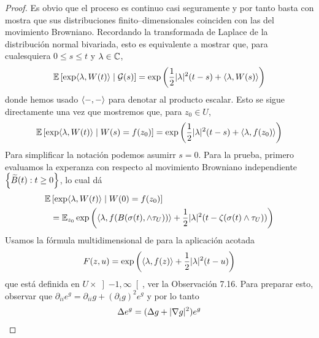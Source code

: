 \begin{proof}
  Es obvio que el proceso es continuo casi seguramente y por tanto basta con mostra que sus distribuciones finito--dimensionales coinciden con las del movimiento Browniano.
  Recordando la transformada de Laplace de la distribución normal bivariada, esto es equivalente a mostrar que, para cualesquiera \(0 \leq s \leq t\) y \(\lambda \in \mathbb{C}\),
  \begin{align}
    \operatorname{\mathbb{E}}\left[ \exp \langle\lambda, W(t)\rangle \mid \mathcal{G}(s) \right]
    =
    \exp\left( \frac{1}{2} \lvert\lambda\rvert^2 (t - s) + \langle\lambda, W(s)\rangle \right)
  \end{align}
  donde hemos usado \(\langle- , -\rangle\) para denotar al producto escalar.
  Esto se sigue directamente una vez que mostremos que, para \(z_0 \in U\),
  \begin{align}
    \label{equation:ConformalInvarianceOfPlanarBrownianMotion_MainEquation}
    \operatorname{\mathbb{E}}\left[ 
      \exp\langle\lambda, W(t)\rangle 
      \mid W(s) = f(z_0)
    \right]
    =
    \exp\left( \frac{1}{2} \lvert\lambda\rvert^2 (t - s) + \langle\lambda, f(z_0)\rangle \right)
  \end{align}
  Para simplificar la notación podemos asumirr \(s = 0\).
  Para la prueba, primero evaluamos la experanza con respecto al movimiento Browniano independiente \(\left\{ \widetilde{B}(t) : t \geq 0 \right\}\), lo cual dá
  \begin{align}
    \operatorname{\mathbb{E}} &\left[
      \exp \langle\lambda, W(t)\rangle
      \mid 
      W(0) = f(z_0) 
    \right]
    \\&=
    \operatorname{\mathbb{E}}_{z_0} \exp \left(
      \langle\lambda, f(B(\sigma(t), \wedge \tau_U))\rangle 
      + \frac{1}{2} \lvert\lambda\rvert^2 (t - \zeta(\sigma(t) \wedge \tau_U))
    \right)
  \end{align}
  Usamos la fórmula multidimensional de \ito para la aplicación acotada
  \begin{align}
    F(z, u)
    =
    \exp\left(
      \langle\lambda, f(z)\rangle
      + \frac{1}{2} \lvert\lambda\rvert^2 (t - u)
    \right)
  \end{align}
  que está definida en \(U \times \left] - 1, \infty \right[\), ver la Observación 7.16.
  Para preparar esto, observar que \(\partial_{i i} e^g = \partial_{i i} g + (\partial_i g)^2 e^g\) y por lo tanto
  \begin{align}
    \label{equation:LaplacianOfExponential}
    \Delta e^g
    =
    (\Delta g + \abs{\nabla g}^2) e^g

\end{align}
\end{proof}
